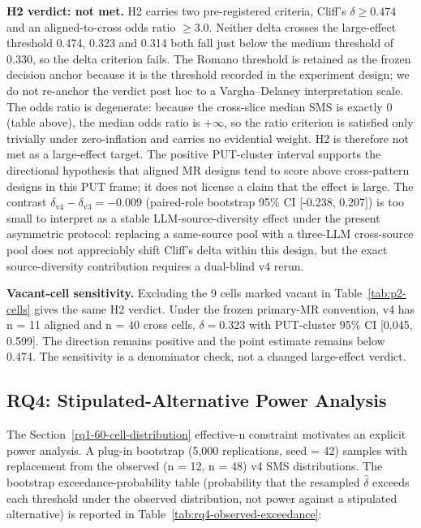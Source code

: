 \documentclass[manuscript,screen,review]{acmart}
\begin{document}
\textbf{H2 verdict: not met.} H2 carries two pre-registered criteria,
Cliff's $\delta \geq 0.474$ and an aligned-to-cross odds ratio
$\geq 3.0$. Neither delta crosses the \citet{romano2006cliff}
large-effect threshold 0.474, 0.323 and 0.314 both fall just below the
\citet{romano2006cliff} medium threshold of 0.330, so the delta criterion fails. The
Romano threshold is retained as the frozen decision anchor because it is
the threshold recorded in the experiment design; we do not re-anchor the
verdict post hoc to a Vargha--Delaney interpretation scale. The
odds ratio is degenerate: because the cross-slice median SMS is exactly
0 (table above), the median odds ratio is $+\infty$, so the ratio
criterion is satisfied only trivially under zero-inflation and carries no
evidential weight. H2 is therefore not met as a large-effect target.
The positive PUT-cluster interval supports the directional hypothesis
that aligned MR designs tend to score above cross-pattern designs in
this PUT frame; it does not license a claim that the effect is large. The
contrast $\delta_{\mathrm{v4}} - \delta_{\mathrm{v3}} = -0.009$ (paired-role
bootstrap 95\% CI {[}-0.238, 0.207{]}) is too small to interpret as a stable LLM-source-diversity effect
under the present asymmetric protocol: replacing a same-source pool with
a three-LLM cross-source pool does not appreciably shift Cliff's delta
within this design, but the exact source-diversity contribution requires
a dual-blind v4 rerun.

\textbf{Vacant-cell sensitivity.} Excluding the 9 cells marked vacant in
Table~\ref{tab:p2-cells} gives the same H2 verdict. Under the frozen
primary-MR convention, v4 has n = 11 aligned and n = 40 cross cells,
$\delta = 0.323$ with PUT-cluster 95\% CI [0.045, 0.599].
The direction remains positive and the point estimate remains below
0.474. The sensitivity is a denominator check, not a changed
large-effect verdict.

\subsection{RQ4: Stipulated-Alternative Power Analysis}\label{rq2-stipulated-alternative-power}

The Section~\ref{rq1-60-cell-distribution} effective-n constraint motivates an explicit power analysis. A
plug-in bootstrap (5,000 replications, seed = 42) samples with
replacement from the observed (n = 12, n = 48) v4 SMS distributions. The
bootstrap exceedance-probability table (probability that the resampled
$\hat\delta$ exceeds each threshold under the observed distribution, not
power against a stipulated alternative) is reported in
Table~\ref{tab:rq4-observed-exceedance}:
\end{document}
